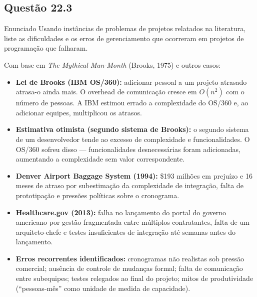 \documentclass[12pt,a4paper]{article}
\begin{document}
\subsection*{Questão 22.3}
\begin{questao}{Enunciado}
Usando instâncias de problemas de projetos relatados na literatura, liste as
dificuldades e os erros de gerenciamento que ocorreram em projetos de
programação que falharam.
\end{questao}
\begin{resposta}
Com base em \textit{The Mythical Man-Month} (Brooks, 1975) e outros casos:

\begin{itemize}
  \item \textbf{Lei de Brooks (IBM OS/360):} adicionar pessoal a um projeto
        atrasado atrasa-o ainda mais. O overhead de comunicação cresce em
        $O(n^2)$ com o número de pessoas. A IBM estimou errado a complexidade
        do OS/360 e, ao adicionar equipes, multiplicou os atrasos.

  \item \textbf{Estimativa otimista (segundo sistema de Brooks):} o segundo
        sistema de um desenvolvedor tende ao excesso de complexidade e
        funcionalidades. O OS/360 sofreu disso — funcionalidades desnecessárias
        foram adicionadas, aumentando a complexidade sem valor correspondente.

  \item \textbf{Denver Airport Baggage System (1994):} \$193 milhões em
        prejuízo e 16 meses de atraso por subestimação da complexidade de
        integração, falta de prototipação e pressões políticas sobre o
        cronograma.

  \item \textbf{Healthcare.gov (2013):} falha no lançamento do portal do
        governo americano por gestão fragmentada entre múltiplos
        contratantes, falta de um arquiteto-chefe e testes insuficientes
        de integração até semanas antes do lançamento.

  \item \textbf{Erros recorrentes identificados:} cronogramas não realistas
        sob pressão comercial; ausência de controle de mudanças formal;
        falta de comunicação entre subequipes; testes relegados ao final
        do projeto; mitos de produtividade (``pessoas-mês'' como unidade
        de medida de capacidade).
\end{itemize}
\end{resposta}
\end{document}

